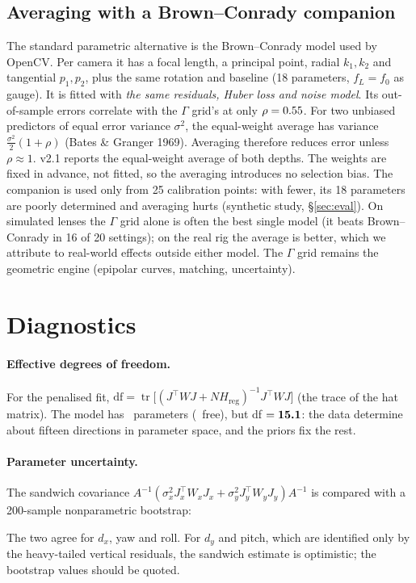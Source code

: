 \documentclass[11pt,a4paper]{article}
\newcommand{\G}{\Gamma}
\begin{document}
\subsection{Averaging with a Brown--Conrady companion}
The standard parametric alternative is the Brown--Conrady model used by OpenCV. Per camera it has a focal
length, a principal point, radial $k_1,k_2$ and tangential $p_1,p_2$, plus the same rotation and baseline (18
parameters, $f_L=f_0$ as gauge). It is fitted with \emph{the same residuals, Huber loss and noise model}. Its
out-of-sample errors correlate with the $\G$ grid's at only $\rho=0.55$. For two unbiased predictors of equal
error variance $\sigma^2$, the equal-weight average has variance $\tfrac{\sigma^2}{2}(1+\rho)$ (Bates \& Granger 1969).
Averaging therefore reduces error unless $\rho\approx1$. v2.1 reports the equal-weight average of both depths. The
weights are fixed in advance, not fitted, so the averaging introduces no selection bias. The companion is used only
from 25 calibration points: with fewer, its 18 parameters are poorly determined and averaging hurts (synthetic
study, \S\ref{sec:eval}). On simulated lenses the $\G$ grid alone is often the best single model (it beats
Brown--Conrady in 16 of 20 settings); on the real rig the average is better, which we attribute to
real-world effects outside either model. The $\G$ grid remains the
geometric engine (epipolar curves, matching, uncertainty).

\section{Diagnostics}
\paragraph{Effective degrees of freedom.} For the penalised fit, $\text{df}=\operatorname{tr}\big[(J^\top WJ+NH_\text{reg})^{-1}J^\top WJ\big]$
(the trace of the hat matrix). The model has \NParams\ parameters (\NFree\ free), but df $=\textbf{15.1}$: the
data determine about fifteen directions in parameter space, and the priors fix the rest.
\paragraph{Parameter uncertainty.} The sandwich covariance $A^{-1}(\sigma_x^2J_x^\top W_xJ_x+\sigma_y^2J_y^\top W_yJ_y)A^{-1}$
is compared with a 200-sample nonparametric bootstrap:
\begin{center}\ParamTable\end{center}
The two agree for $d_x$, yaw and roll. For $d_y$ and pitch, which are identified only by the heavy-tailed vertical
residuals, the sandwich estimate is optimistic; the bootstrap values should be quoted.
\end{document}
